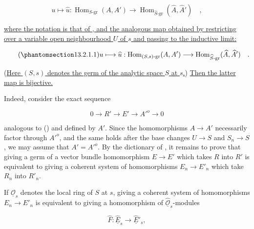 \begin{equation*}
 u\longmapsto\widehat u:
 \operatorname{Hom}_{S\text{-}\mathrm{gr}}(A,A')
 \longrightarrow
 \operatorname{Hom}_{\widehat S\text{-}\mathrm{gr}}
   (\widehat A,\widehat {A}')\quad ,
\end{equation*}

\noindent
\underline{where the notation is that of , and the analogous map
obtained by restricting over a variable open neighbourhood $U$ of $s$
and passing to the inductive limit:}

\begin{equation}\tag{\SGARefTarget{sga7.sga7i.eix.n13-2-1-1}{13.2.1.1}}
 u\longmapsto\widehat u:
 \operatorname{Hom}_{(S,s)\text{-}\mathrm{gr}}(A,A')
 \longrightarrow
 \operatorname{Hom}_{\widehat S\text{-}\mathrm{gr}}
   (\widehat A,\widehat {A}')\quad .
\end{equation}

\noindent
(\underline{Here $(S,s)$ denotes the germ of the analytic space $S$ at
$s$.}) \underline{Then the latter map is bijective.}

Indeed, consider the exact sequence

\begin{equation*}
 0\longrightarrow R'\longrightarrow E'\longrightarrow {A'}^o
 \longrightarrow0
\end{equation*}

\noindent
analogous to () and defined by $A'$. Since the homomorphisms
$A\longrightarrow A'$ necessarily factor through ${A'}^o$, and the same
holds after the base changes $U\longrightarrow S$ and
$S_n\longrightarrow S$, we may assume that $A'={A'}^o$. By the
dictionary of , it remains to prove that giving a germ of a vector
bundle homomorphism $E\longrightarrow E'$ which takes $R$ into $R'$ is
equivalent to giving a coherent system of homomorphisms
$E_n\longrightarrow E'_n$ which take $R_n$ into $R'_n$.

If $\underline{\mathcal O}_s$ denotes the local ring of $S$ at $s$,
giving a coherent system of homomorphisms
$E_n\longrightarrow E'_n$ is equivalent to giving a homomorphism of
$\widehat{\underline{\mathcal O}}_s$-modules

\begin{equation*}
 \widehat F:\widehat{\underline E}_s
 \longrightarrow\widehat{\underline E}'_s,
\end{equation*}


